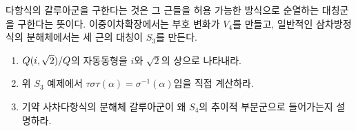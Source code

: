 \begin{keyidea}
다항식의 갈루아군을 구한다는 것은 그 근들을 허용 가능한 방식으로 순열하는 대칭군을 구한다는 뜻이다. 이중이차확장에서는 부호 변화가 $V_4$를 만들고, 일반적인 삼차방정식의 분해체에서는 세 근의 대칭이 $S_3$를 만든다.
\end{keyidea}

\begin{checkpoint}
\begin{enumerate}[label=(\alph*)]
  \item $Q(i,\sqrt2)/Q$의 자동동형을 $i$와 $\sqrt2$의 상으로 나타내라.
  \item 위 $S_3$ 예제에서 $\tau\sigma\tau(\alpha)=\sigma^{-1}(\alpha)$임을 직접 계산하라.
  \item 기약 사차다항식의 분해체 갈루아군이 왜 $S_4$의 추이적 부분군으로 들어가는지 설명하라.
\end{enumerate}
\end{checkpoint}
